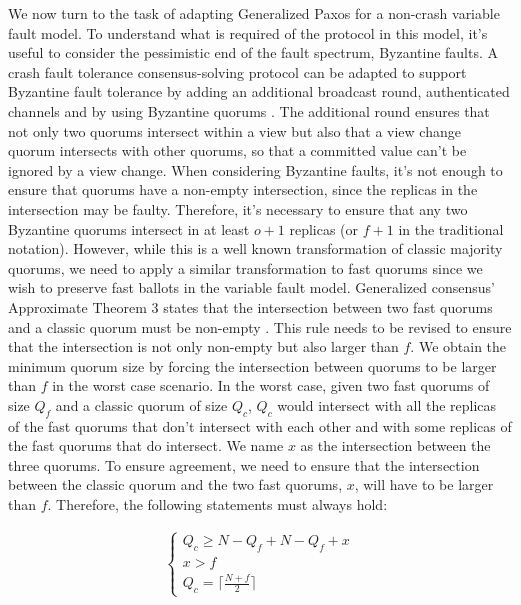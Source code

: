We now turn to the task of adapting Generalized Paxos for a non-crash variable fault model. To understand what is required of the protocol in this model, it's useful to consider the pessimistic end of the fault spectrum, Byzantine faults. A crash fault tolerance consensus-solving protocol can be adapted to support Byzantine fault tolerance by adding an additional broadcast round, authenticated channels and by using Byzantine quorums \cite{Cachin2009}. The additional round ensures that not only two quorums intersect within a view but also that a view change quorum intersects with other quorums, so that a committed value can't be ignored by a view change.
When considering Byzantine faults, it's not enough to ensure that quorums have a non-empty intersection, since the replicas in the intersection may be faulty. Therefore, it's necessary to ensure that any two Byzantine quorums intersect in at least $o+1$ replicas (or $f+1$ in the traditional notation). However, while this is a well known transformation of classic majority quorums, we need to apply a similar transformation to fast quorums since we wish to preserve fast ballots in the variable fault model. Generalized consensus' Approximate Theorem 3 states that the intersection between two fast quorums and a classic quorum must be non-empty \cite{Lamport2005}. This rule needs to be revised to ensure that the intersection is not only non-empty but also larger than $f$. We obtain the minimum quorum size by forcing the intersection between quorums to be larger than $f$ in the worst case scenario. In the worst case, given two fast quorums of size $Q_f$ and a classic quorum of size $Q_c$, $Q_c$ would intersect with all the replicas of the fast quorums that don't intersect with each other and with some replicas of the fast quorums that do intersect. We name $x$ as the intersection between the three quorums. To ensure agreement, we need to ensure that the intersection between the classic quorum and the two fast quorums, $x$, will have to be larger than $f$. Therefore, the following statements must always hold: \par

\begin{gather*}
	\begin{cases}
		Q_c \geq N - Q_f + N-Q_f + x \\
		x > f \\
		Q_c = \lceil \frac{N+f}{2}\rceil
	\end{cases} \\ 
\end{gather*}

